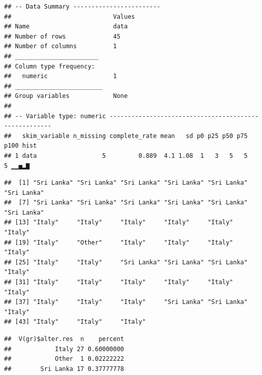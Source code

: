 \documentclass[
]{book}
\newenvironment{Shaded}{\begin{snugshade}}{\end{snugshade}}
\newcommand{\CommentTok}[1]{\textcolor[rgb]{0.56,0.35,0.01}{\textit{#1}}}
\newcommand{\FunctionTok}[1]{\textcolor[rgb]{0.00,0.00,0.00}{#1}}
\newcommand{\NormalTok}[1]{#1}
\newcommand{\SpecialCharTok}[1]{\textcolor[rgb]{0.00,0.00,0.00}{#1}}
\begin{document}
\begin{verbatim}
## -- Data Summary ------------------------
##                            Values
## Name                       data  
## Number of rows             45    
## Number of columns          1     
## _______________________          
## Column type frequency:           
##   numeric                  1     
## ________________________         
## Group variables            None  
## 
## -- Variable type: numeric ------------------------------------------------------
##   skim_variable n_missing complete_rate mean   sd p0 p25 p50 p75 p100 hist 
## 1 data                  5         0.889  4.1 1.08  1   3   5   5    5 ▁▁▅▂▇
\end{verbatim}

\begin{Shaded}
\end{Shaded}

\begin{verbatim}
##  [1] "Sri Lanka" "Sri Lanka" "Sri Lanka" "Sri Lanka" "Sri Lanka" "Sri Lanka"
##  [7] "Sri Lanka" "Sri Lanka" "Sri Lanka" "Sri Lanka" "Sri Lanka" "Sri Lanka"
## [13] "Italy"     "Italy"     "Italy"     "Italy"     "Italy"     "Italy"    
## [19] "Italy"     "Other"     "Italy"     "Italy"     "Italy"     "Italy"    
## [25] "Italy"     "Italy"     "Sri Lanka" "Sri Lanka" "Sri Lanka" "Italy"    
## [31] "Italy"     "Italy"     "Italy"     "Italy"     "Italy"     "Italy"    
## [37] "Italy"     "Italy"     "Italy"     "Sri Lanka" "Sri Lanka" "Italy"    
## [43] "Italy"     "Italy"     "Italy"
\end{verbatim}

\begin{Shaded}
\end{Shaded}

\begin{verbatim}
##  V(gr)$alter.res  n    percent
##            Italy 27 0.60000000
##            Other  1 0.02222222
##        Sri Lanka 17 0.37777778
\end{verbatim}
\end{document}
